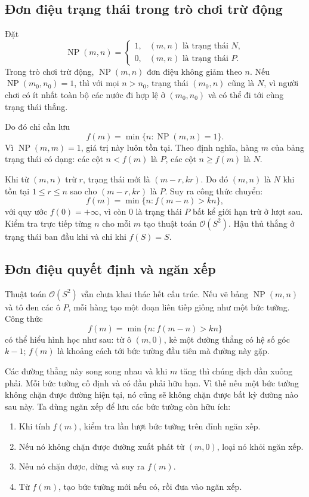 \documentclass[11pt]{article}
\newcommand{\Oh}{\mathcal{O}}
\newcommand{\NP}{\operatorname{NP}}
\begin{document}
\subsection{Đơn điệu trạng thái trong trò chơi trừ động}

Đặt
\[
\NP(m,n)=
\begin{cases}
  1, & (m,n)\text{ là trạng thái }N,\\
  0, & (m,n)\text{ là trạng thái }P.
\end{cases}
\]
Trong trò chơi trừ động, \(\NP(m,n)\) đơn điệu không giảm theo \(n\). Nếu
\(\NP(m_0,n_0)=1\), thì với mọi \(n>n_0\), trạng thái \((m_0,n)\) cũng là
\(N\), vì người chơi có ít nhất toàn bộ các nước đi hợp lệ ở \((m_0,n_0)\) và
có thể đi tới cùng trạng thái thắng.

Do đó chỉ cần lưu
\[
  f(m)=\min\{n:\NP(m,n)=1\}.
\]
Vì \(\NP(m,m)=1\), giá trị này luôn tồn tại. Theo định nghĩa, hàng \(m\) của
bảng trạng thái có dạng: các cột \(n<f(m)\) là \(P\), các cột \(n\ge f(m)\)
là \(N\).

Khi từ \((m,n)\) trừ \(r\), trạng thái mới là \((m-r,kr)\). Do đó
\((m,n)\) là \(N\) khi tồn tại \(1\le r\le n\) sao cho \((m-r,kr)\) là \(P\).
Suy ra công thức chuyển:
\[
  f(m)=\min\{n:f(m-n)>kn\},
\]
với quy ước \(f(0)=+\infty\), vì còn \(0\) là trạng thái \(P\) bất kể giới hạn
trừ ở lượt sau. Kiểm tra trực tiếp từng \(n\) cho mỗi \(m\) tạo thuật toán
\(\Oh(S^2)\). Hậu thủ thắng ở trạng thái ban đầu khi và chỉ khi \(f(S)=S\).

\subsection{Đơn điệu quyết định và ngăn xếp}

Thuật toán \(\Oh(S^2)\) vẫn chưa khai thác hết cấu trúc. Nếu vẽ bảng
\(\NP(m,n)\) và tô đen các ô \(P\), mỗi hàng tạo một đoạn liên tiếp giống như
một bức tường. Công thức
\[
  f(m)=\min\{n:f(m-n)>kn\}
\]
có thể hiểu hình học như sau: từ ô \((m,0)\), kẻ một đường thẳng có hệ số góc
\(k-1\); \(f(m)\) là khoảng cách tới bức tường đầu tiên mà đường này gặp.

Các đường thẳng này song song nhau và khi \(m\) tăng thì chúng dịch dần xuống
phải. Mỗi bức tường cố định và có đầu phải hữu hạn. Vì thế nếu một bức tường
không chặn được đường hiện tại, nó cũng sẽ không chặn được bất kỳ đường nào
sau này. Ta dùng ngăn xếp để lưu các bức tường còn hữu ích:
\begin{enumerate}
  \item Khi tính \(f(m)\), kiểm tra lần lượt bức tường trên đỉnh ngăn xếp.
  \item Nếu nó không chặn được đường xuất phát từ \((m,0)\), loại nó khỏi ngăn
  xếp.
  \item Nếu nó chặn được, dừng và suy ra \(f(m)\).
  \item Từ \(f(m)\), tạo bức tường mới nếu có, rồi đưa vào ngăn xếp.
\end{enumerate}
\end{document}
